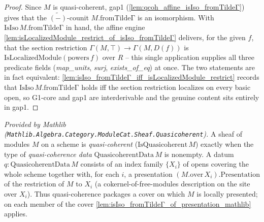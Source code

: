 \begin{proof}
  Since \(M\) is quasi-coherent, gap1 (\cref{lem:qcoh_affine_isIso_fromTildeΓ}) gives that the
  \(\widetilde{(-)}\)-counit \(M.\mathrm{fromTildeΓ}\) is an isomorphism. With
  \(\mathrm{IsIso}\,M.\mathrm{fromTildeΓ}\) in hand, the affine engine
  \cref{lem:isLocalizedModule_restrict_of_isIso_fromTildeΓ} delivers, for the given \(f\), that the
  section restriction \(\Gamma(M, \top) \to \Gamma(M, D(f))\) is
  \(\mathrm{IsLocalizedModule}(\mathrm{powers}\,f)\) over \(R\) -- this single application supplies
  all three predicate fields (\emph{map\_units}, \emph{surj}, \emph{exists\_of\_eq}) at once. The two
  statements are in fact equivalent: \cref{lem:isIso_fromTildeΓ_iff_isLocalizedModule_restrict}
  records that \(\mathrm{IsIso}\,M.\mathrm{fromTildeΓ}\) holds iff the section restriction localizes
  on every basic open, so G1-core and gap1 are interderivable and the genuine content sits entirely
  in gap1.
\end{proof}


\begin{lemma}[Quasi-coherence = a cover with local presentations]
  \label{lem:isQuasicoherent_quasicoherentData_mathlib}
  \mathlibok
  \textit{Provided by Mathlib
  (\texttt{Mathlib.Algebra.Category.ModuleCat.Sheaf.Quasicoherent}).}
  A sheaf of modules \(M\) on a scheme is \emph{quasi-coherent}
  (\(\mathrm{IsQuasicoherent}\,M\)) exactly when the type of \emph{quasi-coherence data}
  \(\mathrm{QuasicoherentData}\,M\) is nonempty. A datum
  \(q : \mathrm{QuasicoherentData}\,M\) consists of an index family \(\{X_i\}\) of opens covering the
  whole scheme together with, for each \(i\), a presentation
  \((M.\mathrm{over}\,X_i).\mathrm{Presentation}\) of the restriction of \(M\) to \(X_i\)
  (a cokernel-of-free-modules description on the site over \(X_i\)). Thus quasi-coherence packages a
  cover on which \(M\) is locally presented; on each member of the cover
  \cref{lem:isIso_fromTildeΓ_of_presentation_mathlib} applies.
\end{lemma}


